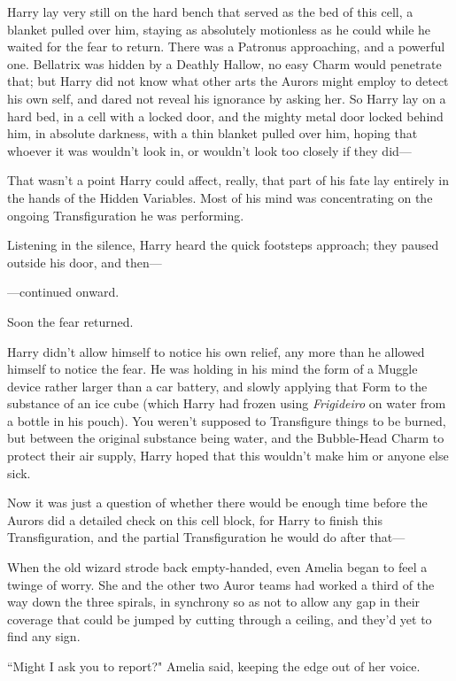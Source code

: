 \later

Harry lay very still on the hard bench that served as the bed of this cell, a blanket pulled over him, staying as absolutely motionless as he could while he waited for the fear to return. There was a Patronus approaching, and a powerful one. Bellatrix was hidden by a Deathly Hallow, no easy Charm would penetrate that; but Harry did not know what other arts the Aurors might employ to detect his own self, and dared not reveal his ignorance by asking her. So Harry lay on a hard bed, in a cell with a locked door, and the mighty metal door locked behind him, in absolute darkness, with a thin blanket pulled over him, hoping that whoever it was wouldn't look in, or wouldn't look too closely if they did—

That wasn't a point Harry could affect, really, that part of his fate lay entirely in the hands of the Hidden Variables. Most of his mind was concentrating on the ongoing Transfiguration he was performing.

Listening in the silence, Harry heard the quick footsteps approach; they paused outside his door, and then—

—continued onward.

Soon the fear returned.

Harry didn't allow himself to notice his own relief, any more than he allowed himself to notice the fear. He was holding in his mind the form of a Muggle device rather larger than a car battery, and slowly applying that Form to the substance of an ice cube (which Harry had frozen using \emph{Frigideiro} on water from a bottle in his pouch). You weren't supposed to Transfigure things to be burned, but between the original substance being water, and the Bubble-Head Charm to protect their air supply, Harry hoped that this wouldn't make him or anyone else sick.

Now it was just a question of whether there would be enough time before the Aurors did a detailed check on this cell block, for Harry to finish this Transfiguration, and the partial Transfiguration he would do after that—

\later

When the old wizard strode back empty-handed, even Amelia began to feel a twinge of worry. She and the other two Auror teams had worked a third of the way down the three spirals, in synchrony so as not to allow any gap in their coverage that could be jumped by cutting through a ceiling, and they'd yet to find any sign.

``Might I ask you to report?" Amelia said, keeping the edge out of her voice.

